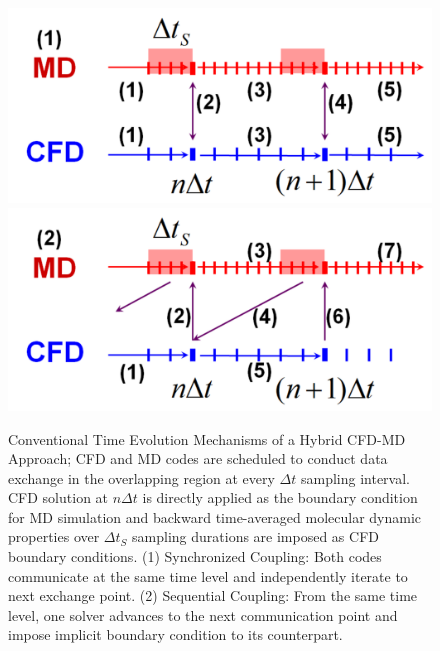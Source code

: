 \documentclass[preprint,12pt]{elsarticle}
\begin{document}
\begin{figure}
\centering
\includegraphics[width=0.8\linewidth]{Synchro_Coupling.pdf}
\includegraphics[width=0.8\linewidth]{Sequential_Coupling.pdf}
\vskip-0.2cm
\caption{\small Conventional Time Evolution Mechanisms of a Hybrid CFD-MD Approach; CFD and MD codes are scheduled to conduct data exchange in the overlapping region at every $\Delta{t}$ sampling interval. CFD solution at $n{\Delta}t$ is directly applied as the boundary condition for MD simulation and backward time-averaged molecular dynamic properties over $\Delta{t_{S}}$ sampling durations are imposed as CFD boundary conditions. (1) Synchronized Coupling: Both codes communicate at the same time level and independently iterate to next exchange point. (2) Sequential Coupling: From the same time level, one solver advances to the next communication point and impose implicit boundary condition to its counterpart.}
\label{Hybrid_Timescale1}
\end{figure}
\end{document}
